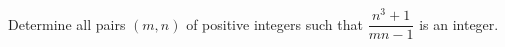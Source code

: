 Determine all pairs $(m, n)$ of positive integers such that $\dfrac{n^3 + 1}{mn - 1}$ is an integer.
